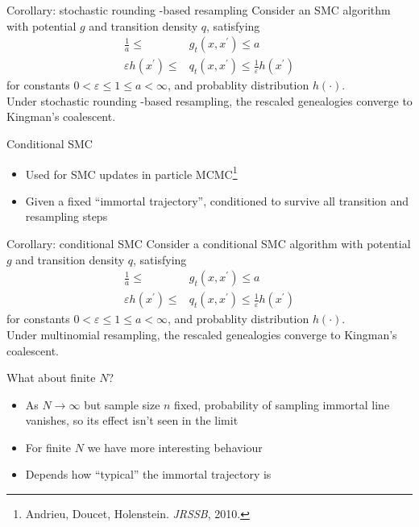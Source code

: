 \documentclass[aspectratio=169]{beamer}
\theoremstyle{definition}
\begin{document}
\begin{frame}{Corollary: stochastic rounding -based resampling}
Consider an SMC algorithm with potential $g$ and transition density $q$, satisfying
\begin{align*}
\frac{1}{a} \leq &g_t(x, x^\prime) \leq a \\
\varepsilon h(x^\prime) \leq &q_t(x, x^\prime) \leq \frac{1}{\varepsilon} h(x^\prime) 
\end{align*}
for constants $0<\varepsilon\leq 1\leq a<\infty$, and probablity distribution $h(\cdot)$.\\[10pt]

Under stochastic rounding -based resampling, the rescaled genealogies converge to Kingman's coalescent.
\end{frame}

\begin{frame}{Conditional SMC}
\begin{itemize}
\item Used for SMC updates in particle MCMC\footnote{Andrieu, Doucet, Holenstein. \textit{JRSSB}, 2010.}
\item Given a fixed ``immortal trajectory'', conditioned to survive all transition and resampling steps
\end{itemize}
\end{frame}

\begin{frame}{Corollary: conditional SMC}
Consider a conditional SMC algorithm with potential $g$ and transition density $q$, satisfying
\begin{align*}
\frac{1}{a} \leq &g_t(x, x^\prime) \leq a \\
\varepsilon h(x^\prime) \leq &q_t(x, x^\prime) \leq \frac{1}{\varepsilon} h(x^\prime) 
\end{align*}
for constants $0<\varepsilon\leq 1\leq a<\infty$, and probablity distribution $h(\cdot)$.\\[10pt]

Under multinomial resampling, the rescaled genealogies converge to Kingman's coalescent.
\end{frame}

\begin{frame}{What about finite $N$?}
\begin{itemize}
\item As $N\to\infty$ but sample size $n$ fixed, probability of sampling immortal line vanishes, so its effect isn't seen in the limit
\pause
\item For finite $N$ we have more interesting behaviour
\item Depends how ``typical'' the immortal trajectory is 
\end{itemize}
\end{frame}
\end{document}
